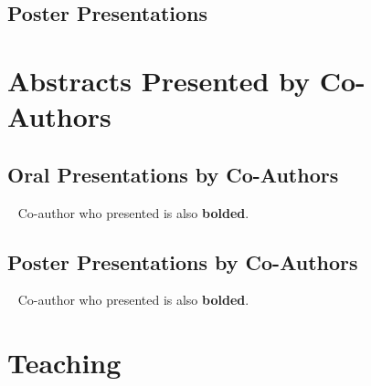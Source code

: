 \documentclass[%
DIV=19,
]{komacv}
\begin{document}
\subsection{Poster Presentations}

\begin{refcontext}[]
\nocite{*}
\printbibliography[keyword=poster, heading=none, resetnumbers=true]
\end{refcontext}

\section{Abstracts Presented by Co-Authors}

\subsection{Oral Presentations by Co-Authors}
~
{\small Co-author who presented is also \textbf{bolded}.}

\begin{refcontext}[]
\nocite{*}
\printbibliography[keyword=talk-coauthor, heading=none, resetnumbers=true]
\end{refcontext}

\subsection{Poster Presentations by Co-Authors}
~
{\small Co-author who presented is also \textbf{bolded}.}

\begin{refcontext}[]
\nocite{*}
\printbibliography[keyword=poster-coauthor, heading=none, resetnumbers=true]
\end{refcontext}

\section{Teaching}
\end{document}
